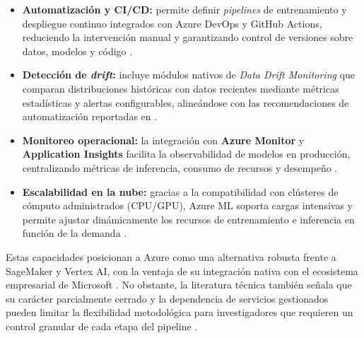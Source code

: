\begin{itemize}
    \item \textbf{Automatización y CI/CD:} permite definir \textit{pipelines} de entrenamiento y despliegue continuo integrados con Azure DevOps y GitHub Actions, reduciendo la intervención manual y garantizando control de versiones sobre datos, modelos y código \citep{Berberi2025,Bhatt2025,AzureML2023}.
    \item \textbf{Detección de \textit{drift}:} incluye módulos nativos de \textit{Data Drift Monitoring} que comparan distribuciones históricas con datos recientes mediante métricas estadísticas y alertas configurables, alineándose con las recomendaciones de automatización reportadas en \citep{Bhatt2025}. 
    \item \textbf{Monitoreo operacional:} la integración con \textbf{Azure Monitor} y \textbf{Application Insights} facilita la observabilidad de modelos en producción, centralizando métricas de inferencia, consumo de recursos y desempeño \citep{Berberi2025,AzureMonitor2022}.
    \item \textbf{Escalabilidad en la nube:} gracias a la compatibilidad con clústeres de cómputo administrados (CPU/GPU), Azure ML soporta cargas intensivas y permite ajustar dinámicamente los recursos de entrenamiento e inferencia en función de la demanda \citep{Berberi2025}.
\end{itemize}

Estas capacidades posicionan a Azure como una alternativa robusta frente a SageMaker y Vertex AI, con la ventaja de su integración nativa con el ecosistema empresarial de Microsoft \citep{Berberi2025}. No obstante, la literatura técnica también señala que su carácter parcialmente cerrado y la dependencia de servicios gestionados pueden limitar la flexibilidad metodológica para investigadores que requieren un control granular de cada etapa del pipeline \citep{Bhatt2025,Lopez2022, Xu2022}.

